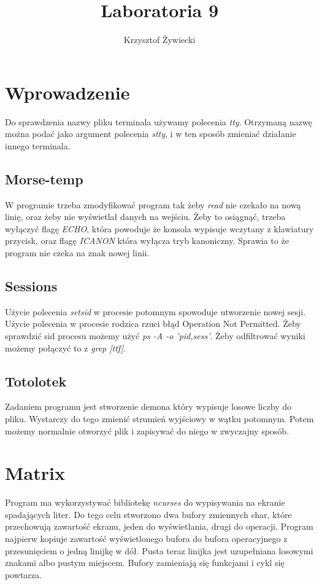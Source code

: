 \documentclass[a4paper, 11pt]{article}
\title{Laboratoria 9}
\author{Krzysztof Żywiecki}
\begin{document}
\maketitle

\section*{Wprowadzenie}

Do sprawdzenia nazwy pliku terminala używamy polecenia \emph{tty}. Otrzymaną nazwę można podać jako argument polecenia \emph{stty}, i w ten sposób zmieniać działanie innego terminala.

\subsection*{Morse-temp}

W programie trzeba zmodyfikować program tak żeby \emph{read} nie czekało na nową linię, oraz żeby nie wyświetlał danych na wejściu. Żeby to osiągnąć, trzeba wyłączyć flagę \emph{ECHO}, która powoduje że konsola wypisuje wczytany z klawiatury przycisk, oraz flagę \emph{ICANON} która wyłącza tryb kanoniczny. Sprawia to że program nie czeka na znak nowej linii.

\subsection*{Sessions}

Użycie polecenia \emph{setsid} w procesie potomnym spowoduje utworzenie nowej sesji. Użycie polecenia w procesie rodzica rzuci błąd Operation Not Permitted.
Żeby sprawdzić sid procesu możemy użyć \emph{ps -A -o 'pid,sess'}. Żeby odfiltrować wyniki możemy połączyć to z \emph{grep [ttf]}.

\subsection*{Totolotek}

Zadaniem programu jest stworzenie demona który wypisuje losowe liczby do pliku. Wystarczy do tego zmienić strumień wyjściowy w wątku potomnym. Potem możemy normalnie otworzyć plik i zapisywać do niego w zwyczajny sposób.

\section*{Matrix}

Program ma wykorzystywać bibliotekę \emph{ncurses} do wypisywania na ekranie spadających liter. Do tego celu stworzono dwa bufory zmiennych char, które przechowują zawartość ekranu, jeden do wyświetlania, drugi do operacji. Program najpierw kopiuje zawartość wyświetlonego bufora do bufora operacyjnego z przesunięciem o jedną linijkę w dół. Pusta teraz linijka jest uzupełniana losowymi znakami albo pustym miejscem. Bufory zamieniają się funkcjami i cykl się powtarza.
\end{document}
